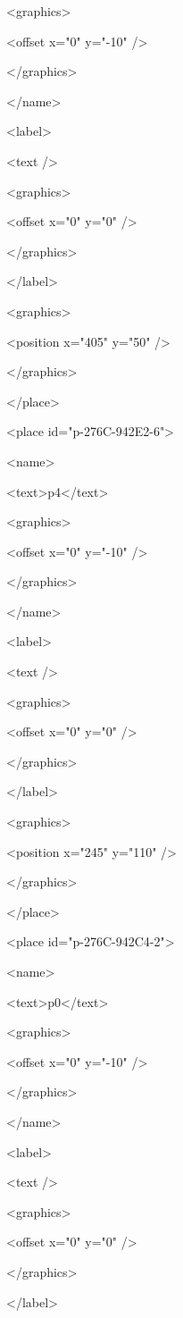      <graphics>

      <offset x="0" y="-10" />

     </graphics>

    </name>

    <label>

     <text />

     <graphics>

      <offset x="0" y="0" />

     </graphics>

    </label>

    <graphics>

     <position x="405" y="50" />

    </graphics>

   </place>

   <place id="p-276C-942E2-6">

    <name>

     <text>p4</text>

     <graphics>

      <offset x="0" y="-10" />

     </graphics>

    </name>

    <label>

     <text />

     <graphics>

      <offset x="0" y="0" />

     </graphics>

    </label>

    <graphics>

     <position x="245" y="110" />

    </graphics>

   </place>

   <place id="p-276C-942C4-2">

    <name>

     <text>p0</text>

     <graphics>

      <offset x="0" y="-10" />

     </graphics>

    </name>

    <label>

     <text />

     <graphics>

      <offset x="0" y="0" />

     </graphics>

    </label>

